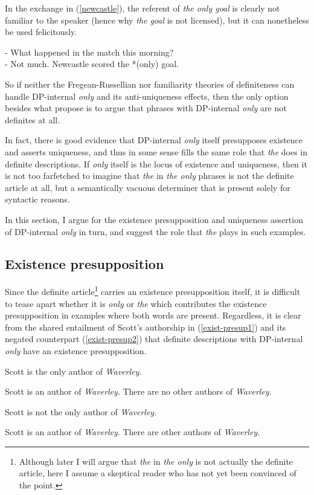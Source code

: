 In the exchange in (\ref{newcastle}), the referent of \textit{the only goal} is clearly not familiar to the speaker (hence why \textit{the goal} is not licensed), but it can nonetheless be used felicitously.

\begin{exe}
	\ex \label{newcastle} - What happened in the match this morning? \\
	    - Not much. Newcastle scored the *(only) goal.
\end{exe}

So if neither the Fregean-Russellian nor familiarity theories of definiteness can handle DP-internal \textit{only} and its anti-uniqueness effects, then the only option besides what \citeauthor{cb2015} propose is to argue that phrases with DP-internal \textit{only} are not definites at all.

In fact, there is good evidence that DP-internal \textit{only} itself presupposes existence and asserts uniqueness, and thus in some sense fills the same role that \textit{the} does in definite descriptions. If \textit{only} itself is the locus of existence and uniqueness, then it is not too farfetched to imagine that \textit{the} in \textit{the only} phrases is not the definite article at all, but a semantically vacuous determiner that is present solely for syntactic reasons.

In this section, I argue for the existence presupposition and uniqueness assertion of DP-internal \textit{only} in turn, and suggest the role that \textit{the} plays in such examples.

\subsection{Existence presupposition}
Since the definite article\footnote{Although later I will argue that \textit{the} in \textit{the only} is not actually the definite article, here I assume a skeptical reader who has not yet been convinced of the point.} carries an existence presupposition itself, it is difficult to tease apart whether it is \textit{only} or \textit{the} which contributes the existence presupposition in examples where both words are present. Regardless, it is clear from the shared entailment of Scott's authorship in (\ref{exist-presup1}) and its negated counterpart (\ref{exist-presup2}) that definite descriptions with DP-internal \textit{only} have an existence presupposition.

\begin{exe}
	\ex \label{exist-presup1} Scott is the only author of \textit{Waverley}.
		\begin{xlist}
			\ex Scott is an author of \textit{Waverley}.
			\ex There are no other authors of \textit{Waverley}.
		\end{xlist}
	\ex \label{exist-presup2} Scott is not the only author of \textit{Waverley}.
		\begin{xlist}
			\ex Scott is an author of \textit{Waverley}.
			\ex There are other authors of \textit{Waverley}.
		\end{xlist}
\end{exe}

